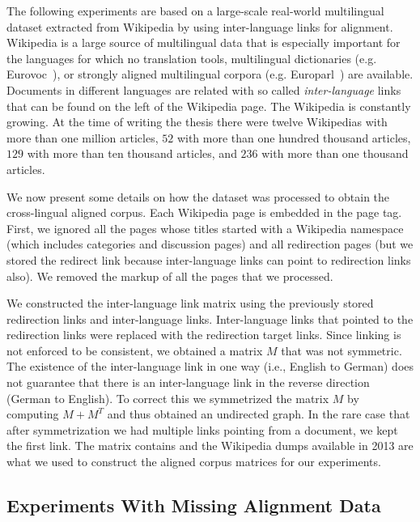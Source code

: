 The following experiments are based on a large-scale real-world multilingual dataset
extracted from Wikipedia by using inter-language links for alignment. 
Wikipedia is a large source of multilingual data that is especially important for the languages for which no 
translation tools, multilingual dictionaries (e.g. Eurovoc~\cite{eurovoc}), or strongly
aligned multilingual corpora (e.g. Europarl~\cite{europarl}) are available. Documents 
in different languages are related with so called \emph{inter-language} links that 
can be found on the left of the Wikipedia page. The Wikipedia is constantly growing. 
At the time of writing the thesis there were twelve Wikipedias with more than one million articles, $52$ with more 
than one hundred thousand articles, $129$ with more than ten thousand articles, and $236$ 
with more than one thousand articles.

We now present some details on how the dataset was processed to obtain the cross-lingual aligned corpus.
Each Wikipedia page is embedded in the page tag. First, we ignored all the pages whose titles started with a Wikipedia namespace 
(which includes categories and discussion pages) and all redirection pages (but we stored the redirect link because inter-language 
links can point to redirection links also). We removed the markup of all the pages that we processed.

We constructed the inter-language link matrix using the previously stored redirection links and inter-language links. 
Inter-language links that pointed to the redirection links were replaced with the redirection target links. Since linking
is not enforced to be consistent, we obtained a matrix $M$ that was not symmetric. The existence of the inter-language link in 
one way (i.e., English to German) does not guarantee that there is an inter-language link in the reverse direction (German to English). 
To correct this we symmetrized the matrix $M$ by computing $M+M^T$ and thus obtained an undirected graph. In the rare case that 
after symmetrization we had multiple links pointing from a document, we kept the first link. The matrix contains and
the Wikipedia dumps available in 2013 are what we used to construct the aligned corpus matrices for our experiments.

\subsection{Experiments With Missing Alignment Data}\label{experiments:hubcca}

